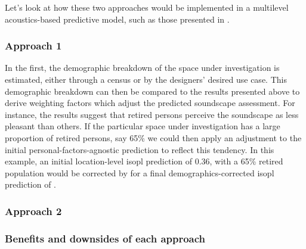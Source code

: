 Let's look at how these two approaches would be implemented in a multilevel acoustics-based predictive model, such as those presented in .

\subsubsection{Approach 1}
In the first, the demographic breakdown of the space under investigation is estimated, either through a census or by the designers' desired use case. This demographic breakdown can then be compared to the results presented above \citep{Erfanian2021Psychological} to derive weighting factors which adjust the predicted soundscape assessment. For instance, the results suggest that retired persons perceive the soundscape as  less pleasant than others. If the particular space under investigation has a large proportion of retired persons, say 65\% we could then apply an adjustment to the initial personal-factors-agnostic prediction to reflect this tendency. In this example, an initial location-level \gls{isopl} prediction of 0.36, with a 65\% retired population would be corrected by  for a final demographics-corrected \gls{isopl} prediction of .

\subsubsection{Approach 2}

\subsubsection{Benefits and downsides of each approach}